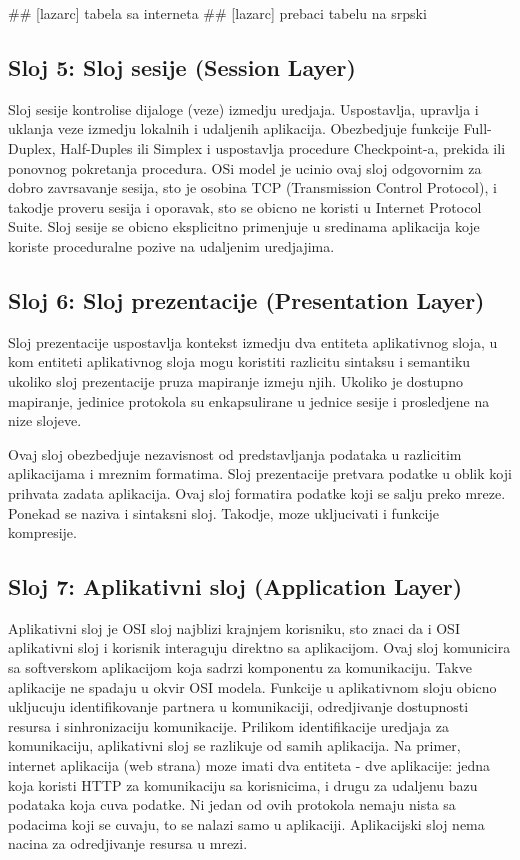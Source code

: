 \documentclass[a4paper,12pt, master]{etf}
\begin{document}
	\#\# [lazarc] tabela sa interneta
	\#\# [lazarc] prebaci tabelu na srpski

	\subsection{Sloj 5: Sloj sesije (Session Layer)}

	Sloj sesije kontrolise dijaloge (veze) izmedju uredjaja. Uspostavlja, upravlja i uklanja veze
	izmedju lokalnih i udaljenih aplikacija. Obezbedjuje funkcije Full-Duplex, Half-Duples ili
	Simplex i uspostavlja procedure Checkpoint-a, prekida ili ponovnog pokretanja procedura. OSi
	model je ucinio ovaj sloj odgovornim za dobro zavrsavanje sesija, sto je osobina TCP
	(Transmission Control Protocol), i takodje proveru sesija i oporavak, sto se obicno ne koristi
	u Internet Protocol Suite. Sloj sesije se obicno eksplicitno primenjuje u sredinama aplikacija
	koje koriste proceduralne pozive na udaljenim uredjajima.

	\subsection{Sloj 6: Sloj prezentacije (Presentation Layer)}

	Sloj prezentacije uspostavlja kontekst izmedju dva entiteta aplikativnog sloja, u kom entiteti
	aplikativnog sloja mogu koristiti razlicitu sintaksu i semantiku ukoliko sloj prezentacije
	pruza mapiranje izmeju njih. Ukoliko je dostupno mapiranje, jedinice protokola su enkapsulirane
	u jednice sesije i prosledjene na nize slojeve.

	Ovaj sloj obezbedjuje nezavisnost od predstavljanja podataka u razlicitim aplikacijama i
	mreznim formatima. Sloj prezentacije pretvara podatke u oblik koji prihvata zadata aplikacija.
	Ovaj sloj formatira podatke koji se salju preko mreze. Ponekad se naziva i sintaksni sloj.
	Takodje, moze ukljucivati i funkcije kompresije.

	\subsection{Sloj 7: Aplikativni sloj (Application Layer)}

	Aplikativni sloj je OSI sloj najblizi krajnjem korisniku, sto znaci da i OSI aplikativni sloj i
	korisnik interaguju direktno sa aplikacijom. Ovaj sloj komunicira sa softverskom aplikacijom
	koja sadrzi komponentu za komunikaciju. Takve aplikacije ne spadaju u okvir OSI modela.
	Funkcije u aplikativnom sloju obicno ukljucuju identifikovanje partnera u komunikaciji,
	odredjivanje dostupnosti resursa i sinhronizaciju komunikacije. Prilikom identifikacije
	uredjaja za komunikaciju, aplikativni sloj se razlikuje od samih aplikacija. Na primer,
	internet aplikacija (web strana) moze imati dva entiteta - dve aplikacije: jedna koja koristi
	HTTP za komunikaciju sa korisnicima, i drugu za udaljenu bazu podataka koja cuva podatke. Ni
	jedan od ovih protokola nemaju nista sa podacima koji se cuvaju, to se nalazi samo u
	aplikaciji. Aplikacijski sloj nema nacina za odredjivanje resursa u mrezi.
\end{document}
